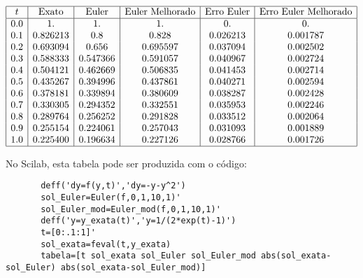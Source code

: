 \begin{Answer}
\begin{tiny}
 $$\begin{array}{|c|c|c|c|c|c|}
\hline
t &  \hbox{Exato} & \hbox{Euler} & \hbox{Euler Melhorado} & \hbox{Erro Euler} & \hbox{Erro Euler Melhorado}\\
\hline
0.0&    1.          &1.          &1.          &0.          &0.       \\ 
0.1&    0.826213    &0.8         &0.828       &0.026213    &0.001787\\  
0.2&    0.693094    &0.656       &0.695597    &0.037094    &0.002502  \\
0.3&    0.588333    &0.547366    &0.591057    &0.040967    &0.002724  \\
0.4&    0.504121    &0.462669    &0.506835    &0.041453    &0.002714  \\
0.5&    0.435267    &0.394996    &0.437861    &0.040271    &0.002594  \\
0.6&    0.378181    &0.339894    &0.380609    &0.038287    &0.002428  \\
0.7&    0.330305    &0.294352    &0.332551    &0.035953    &0.002246  \\
0.8&    0.289764    &0.256252    &0.291828    &0.033512    &0.002064  \\
0.9&    0.255154    &0.224061    &0.257043    &0.031093    &0.001889  \\
1.0&    0.225400    &0.196634    &0.227126    &0.028766    &0.001726\\

\hline
\end{array}
$$

\ifisscilab
      No Scilab, esta tabela pode ser produzida com o código:
      \begin{verbatim}
       deff('dy=f(y,t)','dy=-y-y^2')
       sol_Euler=Euler(f,0,1,10,1)'
       sol_Euler_mod=Euler_mod(f,0,1,10,1)'
       deff('y=y_exata(t)','y=1/(2*exp(t)-1)')
       t=[0:.1:1]'
       sol_exata=feval(t,y_exata)
       tabela=[t sol_exata sol_Euler sol_Euler_mod abs(sol_exata-sol_Euler) abs(sol_exata-sol_Euler_mod)]
      \end{verbatim}

    \fi
 \end{tiny}
\end{Answer}


